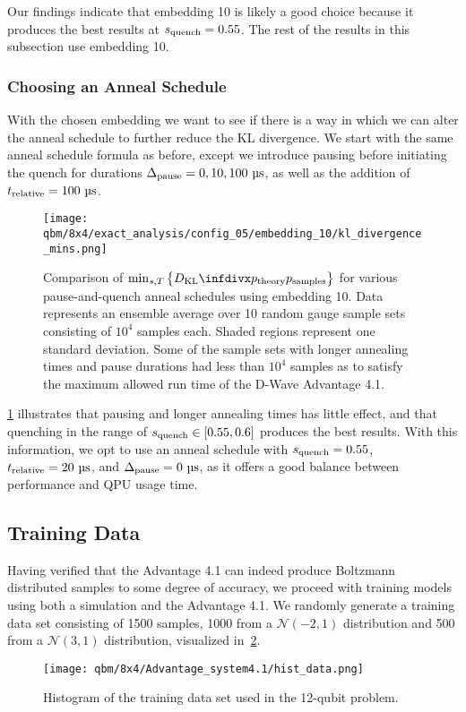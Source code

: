 Our findings indicate that embedding 10 is likely a good choice because it produces the best results at \( s_{\text{quench}} = 0.55 \).
The rest of the results in this subsection use embedding 10.

\subsubsection{Choosing an Anneal Schedule}\label{sec:choosing_an_anneal_schedule}
With the chosen embedding we want to see if there is a way in which we can alter the anneal schedule to further reduce the KL divergence.
We start with the same anneal schedule formula as before, except we introduce pausing before initiating the quench for durations \( \Deltapause = 0, 10, 100 \ \si{\micro\second} \), as well as the addition of \( t_{\text{relative}} = 100 \ \si{\micro\second} \).

\begin{figure}[!htb]
    \begin{center}
        \texttt{[image: qbm/8x4/exact\_analysis/config\_05/embedding\_10/kl\_divergence\_mins.png]}
    \end{center}
    \caption{
        Comparison of \( \min_{s,T}\big\{\DKL{\ptheory}{\psamples}\big\} \) for various pause-and-quench anneal schedules using embedding 10.
        Data represents an ensemble average over 10 random gauge sample sets consisting of \( 10^4 \) samples each.
        Shaded regions represent one standard deviation.
        Some of the sample sets with longer annealing times and pause durations had less than \( 10^4 \) samples as to satisfy the maximum allowed run time of the D-Wave Advantage 4.1.
    }
    \label{fig:dkl_mins_embedding_05}
\end{figure}

\cref{fig:dkl_mins_embedding_05} illustrates that pausing and longer annealing times has little effect, and that quenching in the range of \( s_{\text{quench}} \in [0.55, 0.6] \) produces the best results.
With this information, we opt to use an anneal schedule with \( s_{\text{quench}} = 0.55 \), \( \trelative = 20 \ \si{\micro\second} \), and \( \Delta_{\text{pause}} = 0 \ \si{\micro\second} \), as it offers a good balance between performance and QPU usage time.

\subsection{Training Data}
Having verified that the Advantage 4.1 can indeed produce Boltzmann distributed samples to some degree of accuracy, we proceed with training models using both a simulation and the Advantage 4.1.
We randomly generate a training data set consisting of 1500 samples, 1000 from a \( \mathcal{N}(-2, 1) \) distribution and 500 from a \( \mathcal{N}(3, 1) \) distribution, visualized in~\cref{fig:hist_data}.
\begin{figure}[!htb]
    \begin{center}
        \texttt{[image: qbm/8x4/Advantage\_system4.1/hist\_data.png]}
    \end{center}
    \caption{
        Histogram of the training data set used in the 12-qubit problem.
    }
    \label{fig:hist_data}
\end{figure}


